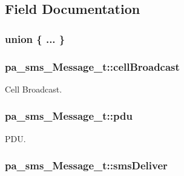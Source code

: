 \subsection{Field Documentation}
\subsubsection[{\texorpdfstring{"@29}{@29}}]{\setlength{\rightskip}{0pt plus 5cm}union \{ ... \} }\hypertarget{structpa__sms___message__t_a29ab2d8e7033a9b5b8431b4cee532bbb}{}\label{structpa__sms___message__t_a29ab2d8e7033a9b5b8431b4cee532bbb}
\subsubsection[{\texorpdfstring{cell\+Broadcast}{cellBroadcast}}]{ pa\+\_\+sms\+\_\+\+Message\+\_\+t\+::cell\+Broadcast}\hypertarget{structpa__sms___message__t_a6656080bbc251416607129c17afa93e0}{}\label{structpa__sms___message__t_a6656080bbc251416607129c17afa93e0}


Cell Broadcast. 

\subsubsection[{\texorpdfstring{pdu}{pdu}}]{ pa\+\_\+sms\+\_\+\+Message\+\_\+t\+::pdu}\hypertarget{structpa__sms___message__t_a8e7f4d7548bf7b7654e829d250b2c27f}{}\label{structpa__sms___message__t_a8e7f4d7548bf7b7654e829d250b2c27f}


P\+DU. 

\subsubsection[{\texorpdfstring{sms\+Deliver}{smsDeliver}}]{ pa\+\_\+sms\+\_\+\+Message\+\_\+t\+::sms\+Deliver}\hypertarget{structpa__sms___message__t_aaa5ecf217cd15b629c75320006f4c55a}{}\label{structpa__sms___message__t_aaa5ecf217cd15b629c75320006f4c55a}


